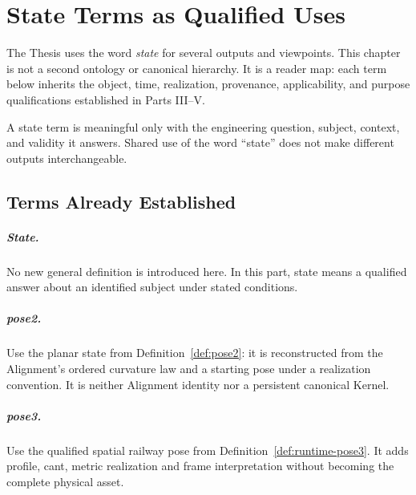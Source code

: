 
\chapter{State Terms as Qualified Uses}
\label{chap:state-taxonomy}

The Thesis uses the word \emph{state} for several outputs and viewpoints. This
chapter is not a second ontology or canonical hierarchy. It is a reader map:
each term below inherits the object, time, realization, provenance,
applicability, and purpose qualifications established in Parts III--V.

\begin{principle}
\label{princ:state-layer-principle}
A state term is meaningful only with the engineering question, subject,
context, and validity it answers. Shared use of the word ``state'' does not
make different outputs interchangeable.
\end{principle}

\section{Terms Already Established}

\paragraph{State.}
\label{def:taxonomy-general-state}
No new general definition is introduced here. In this part, state means a
qualified answer about an identified subject under stated conditions.

\paragraph{pose2.}
\label{def:taxonomy-pose2}
Use the planar state from Definition~\ref{def:pose2}: it is reconstructed from the
Alignment's ordered curvature law and a starting pose under a realization
convention. It is neither Alignment identity nor a persistent canonical
Kernel.

\paragraph{pose3.}
\label{def:taxonomy-pose3}
Use the qualified spatial railway pose from
Definition~\ref{def:runtime-pose3}. It adds
profile, cant, metric realization and frame interpretation without becoming
the complete physical asset.

